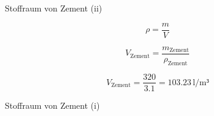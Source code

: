 \begin{frame}{Stoffraum von Zement (ii)}

    \begin{equation*}
        \rho = \dfrac{m}{V}
    \end{equation*}
    \pause



    \begin{equation*}
        V_{\text{Zement}} = \dfrac{m_{\text{Zement}}}{\rho_{\text{Zement}}}
    \end{equation*}

    \pause
    \vspace{0.5cm}
    \begin{equation*}
        V_{\text{Zement}} = \dfrac{320}{3.1} = 103.23 \, \text{l/m³}
    \end{equation*}
\end{frame}



\begin{frame}{Stoffraum von Zement (i)}
    \begin{table}[h]
        \centering
        \caption{Aufgabe zur Stoffraumberechnung}
        \small
    \label{tab:Stoffraumberechnung}
        \end{table}

\end{frame}

